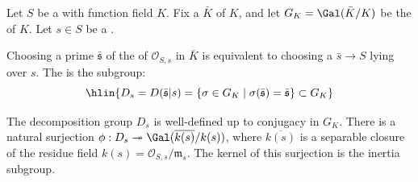 \begin{definition} \label{definition:decomposition_group_of_a_dedekind_scheme_at_a_closed_point}
    Let $S$ be a  with function field $K$. Fix a  $\bar{K}$ of $K$, and let $G_K = \Gal(\bar{K}/K)$ be the  of $K$. Let $s \in S$ be a .

    Choosing a prime $\bar{\mathfrak{s}}$ of the  of $\mathcal{O}_{S, s}$ in $\bar{K}$ is equivalent to choosing a  $\bar{s} \to S$ lying over $s$. The  is the subgroup:
    $$\hlin{D_s = D(\bar{\mathfrak{s}} | s) = \{ \sigma \in G_K \mid \sigma(\bar{\mathfrak{s}}) = \bar{\mathfrak{s}} \} \subset G_K}$$

    The decomposition group $D_s$ is well-defined up to conjugacy in $G_K$. There is a natural surjection $\phi: D_s \twoheadrightarrow \Gal(\overline{k(s)}/k(s))$, where $\overline{k(s)}$ is a separable closure of the residue field $k(s) = \mathcal{O}_{S, s} / \mathfrak{m}_s$. The kernel of this surjection is the inertia subgroup.
\end{definition}